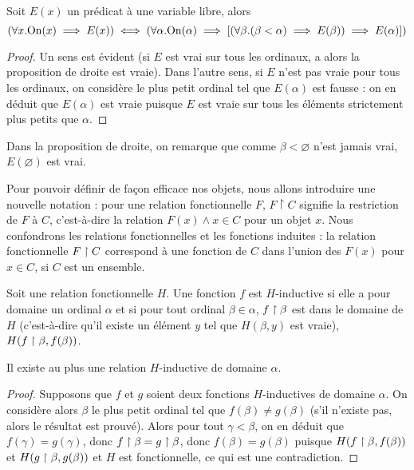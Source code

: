 \begin{prop}
    Soit $E(x)$ un prédicat à une variable libre, alors $$\left(\forall x. \mathrm{On}(x)\implies E(x)\right) \iff \left(\forall \alpha.\mathrm{On}(\alpha) \implies [(\forall \beta. (\beta < \alpha) \implies E(\beta))\implies E(\alpha)]\right)$$
\end{prop}

\begin{proof}
    Un sens est évident (si $E$ est vrai sur tous les ordinaux, a alors la proposition de droite est vraie). Dans l'autre sens, si $E$ n'est pas vraie pour tous les ordinaux, on considère le plus petit ordinal tel que $E(\alpha)$ est fausse : on en déduit que $E(\alpha)$ est vraie puisque $E$ est vraie sur tous les éléments strictement plus petits que $\alpha$.
\end{proof}

\begin{rmk}
    Dans la proposition de droite, on remarque que comme $\beta < \varnothing$ n'est jamais vrai, $E(\varnothing)$ est vrai.
\end{rmk}

Pour pouvoir définir de façon efficace nos objets, nous allons introduire une nouvelle notation : pour une relation fonctionnelle $F$, $F \upharpoonright C$ signifie la restriction de $F$ à $C$, c'est-à-dire la relation $F(x) \land x\in C$ pour un objet $x$. Nous confondrons les relations fonctionnelles et les fonctions induites : la relation fonctionnelle $F\upharpoonright C$ correspond à une fonction de $C$ dans l'union des $F(x)$ pour $x\in C$, si $C$ est un ensemble.

\begin{defi}
    Soit une relation fonctionnelle $H$. Une fonction $f$ est $H$-inductive si elle a pour domaine un ordinal $\alpha$ et si pour tout ordinal $\beta\in \alpha$, $f\upharpoonright \beta$ est dans le domaine de $H$ (c'est-à-dire qu'il existe un élément $y$ tel que $H(\beta,y)$ est vraie), $H(f\upharpoonright \beta,f(\beta))$.
\end{defi}

\begin{prop}
    Il existe au plus une relation $H$-inductive de domaine $\alpha$.
\end{prop}

\begin{proof}
    Supposons que $f$ et $g$ soient deux fonctions $H$-inductives de domaine $\alpha$. On considère alors $\beta$ le plus petit ordinal tel que $f(\beta)\neq g(\beta)$ (s'il n'existe pas, alors le résultat est prouvé). Alors pour tout $\gamma < \beta$, on en déduit que $f(\gamma) = g(\gamma)$, donc $f\upharpoonright \beta = g\upharpoonright \beta$, donc $f(\beta) = g(\beta)$ puisque $H(f\upharpoonright\beta,f(\beta))$ et $H(g\upharpoonright\beta,g(\beta))$ et $H$ est fonctionnelle, ce qui est une contradiction.
\end{proof}

